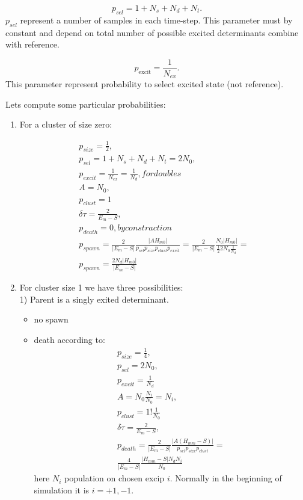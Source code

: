 \documentclass[twoside,english]{uiofysmaster}
\theoremstyle{definition}
\begin{document}
\begin{equation}
p_{sel}= 1+N_{s}+N_{d}+N_{t}.
\end{equation}
$p_{sel}$ represent a number of samples in each time-step. This parameter must by constant and depend on total number of possible excited determinants combine with reference.


\begin{equation}
p_{\text{excit}} = \frac{1}{N_{ex}}.
\end{equation}
This parameter represent probability to select excited state (not reference).


Lets compute some particular probabilities:\\



\begin{enumerate}
	\item For a cluster of size zero:
	
	\begin{align}
	p_{size} = \frac{1}{2},\\
	p_{sel} = 1+N_{s}+N_{d}+N_{t} = 2N_0,\\
	p_{excit}=\frac{1}{N_{ex}} = \frac{1}{N_d}, for doubles\\
	A = N_0,\\
	p_{clust}=1\\
	\delta \tau = \frac{2}{E_m  - S},\\
	p_{death}=0, by constraction\\
	p_{spawn} = \frac{2}{|E_m  - S|} \frac{|AH_{m0}|}{ p_{sel}  p_{size} p_{clust}p_{excit} }=
	\frac{2}{|E_m  - S|} \frac{N_0|H_{m0}|}{ \frac{1}{2}  2N_0 \frac{1}{N_d} }=\\
	p_{spawn} = \frac{2N_d|H_{m0}|}{|E_m  - S|} 
	\end{align}
	
	\item For cluster size 1 we have three possibilities:\\
	1) Parent is a singly exited determinant.
	
	\begin{itemize}
		\item no spawn
		\item death according to:
		\begin{align}
		p_{size} = \frac{1}{4},\\
		p_{sel} =  2N_0,\\
		p_{excit}= \frac{1}{N_d}\\
		A = N_0\frac{N_i}{N_0}=N_i,\\
		p_{clust}=1!\frac{1}{N_0}\\
		\delta \tau = \frac{2}{E_m  - S},\\
		p_{death} = \frac{2}{|E_m - S|} \frac{|A(H_{mm}-S)|}{ p_{sel}  p_{size} p_{clust} }=\\
		\frac{4}{|E_m  - S|} \frac{|H_{mm}-S|N_dN_i}{N_0 }
		\end{align}
		here $N_i$ population on chosen excip $i$. Normally in the beginning of simulation it is $i= +1,-1$.
	\end{itemize}
	

\end{enumerate}
\end{document}
